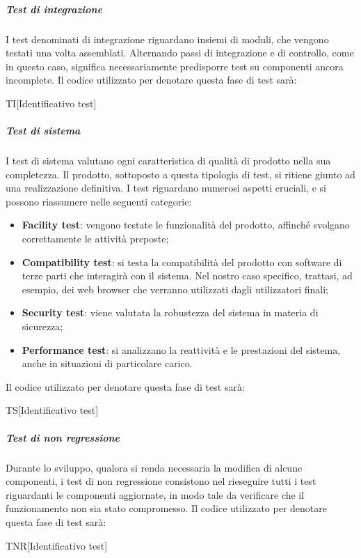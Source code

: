 		\subparagraph{Test di integrazione}
		I test denominati di integrazione riguardano insiemi di moduli, che vengono testati una volta assemblati. Alternando passi di integrazione e di controllo, come in questo caso, significa necessariamente predisporre test su componenti ancora incomplete. Il codice utilizzato per denotare questa fase di test sarà:
		
		\begin{center}
			TI[Identificativo test]
		\end{center}
		
		\subparagraph{Test di sistema}
		I test di sistema valutano ogni caratteristica di qualità di prodotto nella sua completezza. Il prodotto, sottoposto a questa tipologia di test, si ritiene giunto ad una realizzazione definitiva. I test riguardano numerosi aspetti cruciali, e si possono riassumere nelle seguenti categorie:
		
		\begin{itemize}
			\item \textbf{Facility test}: vengono testate le funzionalità del prodotto, affinché svolgano correttamente le attività preposte;
			\item \textbf{Compatibility test}: si testa la compatibilità del prodotto con software di terze parti che interagirà con il sistema. Nel nostro caso specifico, trattasi, ad esempio, dei web browser che verranno utilizzati dagli utilizzatori finali;
			\item \textbf{Security test}: viene valutata la robustezza del sistema in materia di sicurezza;
			\item \textbf{Performance test}: si analizzano la reattività e le prestazioni del sistema, anche in situazioni di particolare carico.
		\end{itemize}
	
		Il codice utilizzato per denotare questa fase di test sarà:
		
		\begin{center}
			TS[Identificativo test]
		\end{center}
	
		\subparagraph{Test di non regressione}
		Durante lo sviluppo, qualora si renda necessaria la modifica di alcune componenti, i test di non regressione consistono nel rieseguire tutti i test riguardanti le componenti aggiornate, in modo tale da verificare che il funzionamento non sia stato compromesso. Il codice utilizzato per denotare questa fase di test sarà:
		
		\begin{center}
			TNR[Identificativo test]
		\end{center}
	
